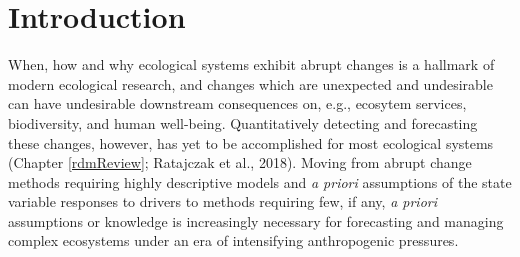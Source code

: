 \documentclass[12pt,twoside,openany]{reedthesis}
\begin{document}
\hypertarget{introduction-3}{%
\section{Introduction}\label{introduction-3}}

When, how and why ecological systems exhibit abrupt changes is a hallmark of modern ecological research, and changes which are unexpected and undesirable can have undesirable downstream consequences on, e.g., ecosytem services, biodiversity, and human well-being. Quantitatively detecting and forecasting these changes, however, has yet to be accomplished for most ecological systems (Chapter \ref{rdmReview}; Ratajczak et al., 2018). Moving from abrupt change methods requiring highly descriptive models and \emph{a priori} assumptions of the state variable responses to drivers to methods requiring few, if any, \emph{a priori} assumptions or knowledge is increasingly necessary for forecasting and managing complex ecosystems under an era of intensifying anthropogenic pressures.
\end{document}

